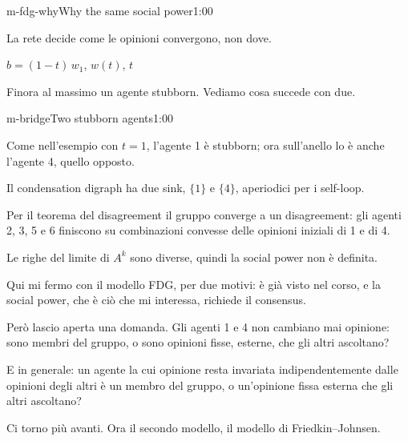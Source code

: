 \begin{slide}{m-fdg-why}{Why the same social power}{1:00 {\color{red}}}
\begin{discorso}
    \item La rete decide come le opinioni convergono, non dove.
    \item {\color{red}              } {\color{red}$b=(1-t)\,w_1$,} {\color{red}        } {\color{red}$w(t)$,} {\color{red} } {\color{red}$t$} {\color{red}}
    \item Finora al massimo un agente stubborn. Vediamo cosa succede con due.
  \end{discorso}
\end{slide}

\begin{slide}{m-bridge}{Two stubborn agents}{1:00}
  \begin{discorso}
    \item Come nell'esempio con $t=1$, l'agente 1 è stubborn; ora sull'anello lo è anche l'agente 4, quello opposto.
    \item Il condensation digraph ha due sink, $\{1\}$ e $\{4\}$, aperiodici per i self-loop.
    \item Per il teorema del disagreement il gruppo converge a un disagreement: gli agenti 2, 3, 5 e 6 finiscono su combinazioni convesse delle opinioni iniziali di 1 e di 4.
    \item Le righe del limite di $A^k$ sono diverse, quindi la social power non è definita.
    \item Qui mi fermo con il modello FDG, per due motivi: è già visto nel corso, e la social power, che è ciò che mi interessa, richiede il consensus.
    \item Però lascio aperta una domanda. Gli agenti 1 e 4 non cambiano mai opinione: sono membri del gruppo, o sono opinioni fisse, esterne, che gli altri ascoltano?
    \item E in generale: un agente la cui opinione resta invariata indipendentemente dalle opinioni degli altri è un membro del gruppo, o un'opinione fissa esterna che gli altri ascoltano?
    \item Ci torno più avanti. Ora il secondo modello, il modello di Friedkin–Johnsen.
  \end{discorso}
\end{slide}

